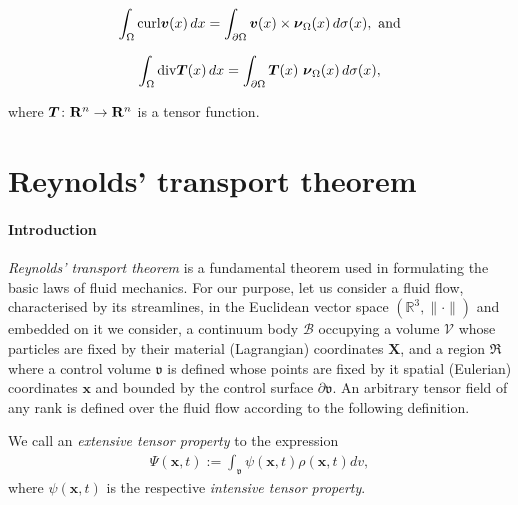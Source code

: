 \begin{equation*}
\int_\Omega \mathrm{curl} \mbox{\boldmath$ v$}(x)\, dx =\int_{\partial \Omega} 
\mbox{\boldmath$ v$}(x)\times \mbox{\boldmath$\nu$}_\Omega(x) \, d\sigma(x),\ \mathrm{and}
\end{equation*}

\begin{equation*}
\int_\Omega \mathrm{div} \mbox{\boldmath$ T$}(x)\, dx =\int_{\partial \Omega} 
\mbox{\boldmath$ T$}(x)\ \mbox{\boldmath$\nu$}_\Omega(x) \, d\sigma(x),
\end{equation*}

\noindent where  $\mbox{\boldmath$ T$}\colon\mathbf R^n \to \mathbf R^n$ is a tensor function.

\section{Reynolds' transport theorem}
\label{reynolds-transport}

\paragraph{Introduction}
{\em Reynolds' transport theorem} \citep{Reynolds:1903} is a
fundamental theorem used in formulating the basic laws of fluid
mechanics. For our purpose, let us consider a fluid flow,
characterised by its streamlines, in the Euclidean vector space
$(\mathbb{R}^3,\lVert\cdot\rVert)$ and embedded on it we consider, a
continuum body $\mathscr{B}$ occupying a volume $\mathscr{V}$ whose
particles are fixed by their material (Lagrangian) coordinates
$\mathbf{X}$, and a region $\Re$ where a control volume $\mathfrak{v}$
is defined whose points are fixed by it spatial (Eulerian) coordinates
$\mathbf{x}$ and bounded by the control surface
$\partial\mathfrak{v}$. An arbitrary tensor field of any rank is
defined over the fluid flow according to the following definition.

\begin{definition*} We call an {\em extensive tensor property} to the expression
\begin{align}
\Psi(\mathbf{x},t):=
\int_{\mathfrak{v}}\psi(\mathbf{x},t)\rho(\mathbf{x},t)dv,
\end{align}
where $\psi(\mathbf{x},t)$ is the respective {\em intensive tensor
  property}.
\end{definition*}

